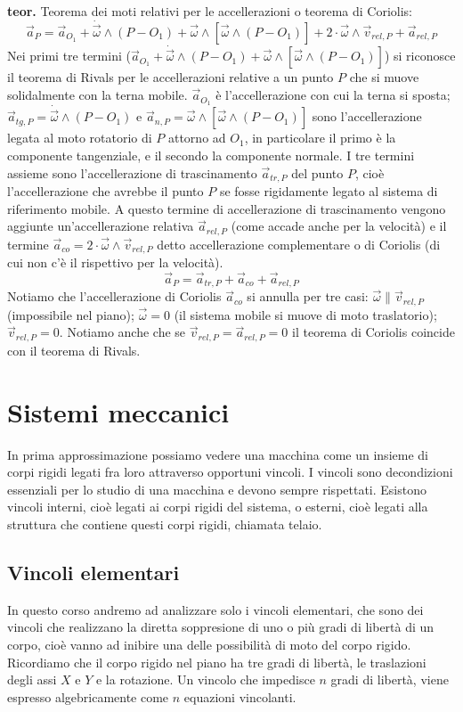 \textbf{teor.} Teorema dei moti relativi per le accellerazioni o teorema di Coriolis:
\[
    \vec{a}_P = \vec{a}_{O_1} + \dot{\vec{\omega}} \land (P-O_1) + \vec{\omega} \land [\vec{\omega}\land (P-O_1)] + 2 \cdot \vec{\omega}\land \vec{v}_{rel,P} + \vec{a}_{rel,P}
\]
Nei primi tre termini ($\vec{a}_{O_1} + \dot{\vec{\omega}} \land (P-O_1) + \vec{\omega} \land [\vec{\omega}\land (P-O_1)]$) si riconosce il teorema di Rivals per le accellerazioni relative a un punto $P$ che si muove solidalmente con la terna mobile. $\vec{a}_{O_1}$ è l'accellerazione con cui la terna si sposta; $\vec{a}_{tg,P} = \dot{\vec{\omega}} \land (P-O_1)$ e $\vec{a}_{n,P} = \vec{\omega} \land [\vec{\omega}\land (P-O_1)]$ sono l'accellerazione legata al moto rotatorio di $P$ attorno ad $O_1$, in particolare il primo è la componente tangenziale, e il secondo la componente normale. I tre termini assieme sono l'accellerazione di trascinamento $\vec{a}_{tr,P}$ del punto $P$, cioè l'accellerazione che avrebbe il punto $P$ se fosse rigidamente legato al sistema di riferimento mobile.\newline
A questo termine di accellerazione di trascinamento vengono aggiunte un'accellerazione relativa $\vec{a}_{rel,P}$ (come accade anche per la velocità) e il termine $\vec{a}_{co} = 2 \cdot \vec{\omega}\land \vec{v}_{rel,P}$ detto accellerazione complementare o di Coriolis (di cui non c'è il rispettivo per la velocità).
\[
    \vec{a}_P = \vec{a}_{tr,P} + \vec{a}_{co} + \vec{a}_{rel,P}
\]
Notiamo che l'accellerazione di Coriolis $\vec{a}_{co}$ si annulla per tre casi: $\vec{\omega} \parallel \vec{v}_{rel,P}$ (impossibile nel piano); $\vec{\omega} = 0$ (il sistema mobile si muove di moto traslatorio); $\vec{v}_{rel,P} = 0$.\newline
Notiamo anche che se $\vec{v}_{rel,P} = \vec{a}_{rel,P} = 0$ il teorema di Coriolis coincide con il teorema di Rivals.\newline
\section{Sistemi meccanici}
In prima approssimazione possiamo vedere una macchina come un insieme di corpi rigidi legati fra loro attraverso opportuni vincoli. I vincoli sono decondizioni essenziali per lo studio di una macchina e devono sempre rispettati.\newline
Esistono vincoli interni, cioè legati ai corpi rigidi del sistema, o esterni, cioè legati alla struttura che contiene questi corpi rigidi, chiamata telaio.
\subsection{Vincoli elementari}
In questo corso andremo ad analizzare solo i vincoli elementari, che sono dei vincoli che realizzano la diretta soppresione di uno o più gradi di libertà di un corpo, cioè vanno ad inibire una delle possibilità di moto del corpo rigido. Ricordiamo che il corpo rigido nel piano ha tre gradi di libertà, le traslazioni degli assi $X$ e $Y$ e la rotazione.\newline
Un vincolo che impedisce $n$ gradi di libertà, viene espresso algebricamente come $n$ equazioni vincolanti.
